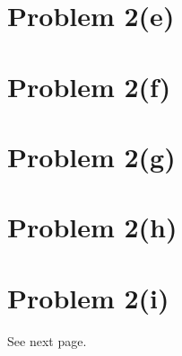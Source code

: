 \documentclass{article}
\begin{document}
\section*{Problem 2(e)}

\section*{Problem 2(f)}

\section*{Problem 2(g)}

\section*{Problem 2(h)}

\section*{Problem 2(i)}

See next page.

\end{document}
